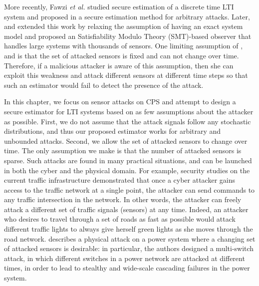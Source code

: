\documentclass[../../thesis.tex]{subfiles}
\begin{document}
More recently, Fawzi \textit{et al.} studied secure estimation of a discrete time LTI system and proposed in \cite{Fawzi:2014} a secure estimation method for arbitrary attacks. 
Later, \cite{Pajic:2014} and \cite{shoukry2016smt} extended this work by relaxing the assumption of having an exact system model and proposed an Satisfiability Modulo Theory (SMT)-based observer that handles large systems with thousands of sensors. 
One limiting assumption of \cite{Fawzi:2014}, \cite{Pajic:2014} and \cite{shoukry2016smt} is that the set of attacked sensors is fixed and can not change over time. 
Therefore, if a malicious attacker is aware of this assumption, then she can exploit this weakness and attack different sensors at different time steps so that such an estimator would fail to detect the presence of the attack.

In this chapter, we focus on sensor attacks on CPS and attempt to design a secure estimator for LTI systems based on as few assumptions about the attacker as possible. 
First, we do not assume that the attack signals follow any stochastic distributions, and thus our proposed estimator works for arbitrary and unbounded attacks.
Second, we allow the set of attacked sensors to change over time.
The only assumption we make is that the number of attacked sensors is sparse.
Such attacks are found in many practical situations, and can be launched in both the cyber and the physical domain.
For example, security studies on the current traffic infrastructure \cite{ghena2014traffic} demonstrated that once a cyber attacker gains access to the traffic network at a single point, the attacker can send commands to any traffic intersection in the network. 
In other words, the attacker can freely attack a different set of traffic signals (sensors) at any time. Indeed, an attacker who desires to travel through a set of roads as fast as possible would attack different traffic lights to always give herself green lights as she moves through the road network. 
\cite{liu2014coordinated} describes a physical attack on a power system where a changing set of attacked sensors is desirable: in particular, the authors designed a multi-switch attack, in which different switches in a power network are attacked at different times, in order to lead to stealthy and wide-scale cascading failures in the power system.
\end{document}
